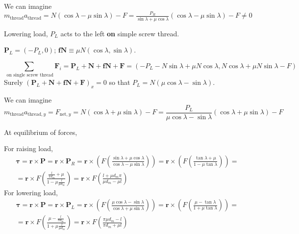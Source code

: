\documentclass[10pt]{amsart}
\begin{document}
\begin{multicols*}{2}
We can imagine $m_{\text{thread}} a_{\text{thread}} = N (\cos{\lambda} - \mu \sin{\lambda}) -F = \frac{P_R}{ \sin{\lambda} + \mu \cos{\lambda} }(\cos{\lambda} - \mu\sin{\lambda} ) -F \neq 0 $

Lowering load, $P_L$ acts to the left \textbf{on} simple screw thread.  

$\mathbf{P}_L = (-P_L ,0)$; $\mathbf{fN} \equiv \mu N(\cos{\lambda}, \sin{\lambda})$.  

\begin{equation}
\sum_{\text{ on single screw thread} } \mathbf{F}_i = \mathbf{P}_L + \mathbf{N} + \mathbf{fN} + \mathbf{F} = (-P_L - N\sin{\lambda} + \mu N \cos{\lambda}, N\cos{\lambda} + \mu N \sin{\lambda} - F)
\end{equation}
Surely $(\mathbf{P}_L + \mathbf{N} + \mathbf{fN} + \mathbf{F})_x =0$ so that $P_L = N(\mu \cos{\lambda} - \sin{\lambda} )$.  

We can imagine 
\[
m_{\text{thread}} a_{\text{thread},y} = F_{\text{net},y} = N(\cos{\lambda} + \mu \sin{\lambda}) - F = \frac{ P_L}{ \mu \cos{\lambda} - \sin{\lambda} } (\cos{\lambda} +\mu \sin{\lambda} ) - F
\]

At equilibrium of forces,

For raising load, 
\[
\begin{gathered}
	\mathbf{\tau} = \mathbf{r} \times \mathbf{P} = \mathbf{r} \times \mathbf{P}_R = \mathbf{r} \times \left( F \left( \frac{ \sin{ \lambda } + \mu \cos{\lambda} }{ \cos{ \lambda} - \mu \sin{\lambda}  } \right) \right) = \mathbf{r} \times \left( F \left( \frac{ \tan{ \lambda } + \mu  }{ 1 - \mu \tan{\lambda}  } \right) \right) = \\
= \mathbf{r} \times F \left( \frac{ \frac{ l}{ \pi d_m } + \mu }{ 1 - \mu \frac{l}{\mu d_m } } \right) = \mathbf{r} \times F \left( \frac{ l + \mu d_m \pi }{ \mu d_m - \mu l } \right)
\end{gathered}
\]
For lowering load, 
\[
\begin{gathered}
	\mathbf{\tau} = \mathbf{r} \times \mathbf{P} = \mathbf{r} \times \mathbf{P}_L = \mathbf{r} \times \left( F \left( \frac{  \mu \cos{ \lambda } -  \sin{\lambda} }{ \cos{ \lambda} + \mu \sin{\lambda}  } \right) \right) = \mathbf{r} \times \left( F \left(   \frac{ \mu -  \tan{ \lambda }   }{ 1 + \mu \tan{\lambda}  } \right) \right) = \\
= \mathbf{r} \times F \left( \frac{ \mu -  \frac{ l}{ \pi d_m }  }{ 1 + \mu \frac{l}{\mu d_m } } \right) = \mathbf{r} \times F \left( \frac{ \pi \mu d_m - l }{ \pi d_m + \mu l } \right)
\end{gathered}
\]


\end{multicols*}
\end{document}
